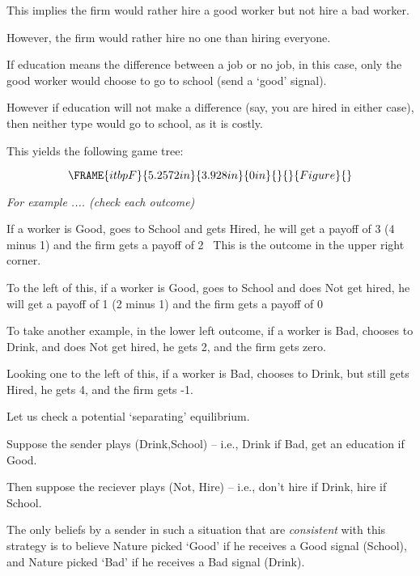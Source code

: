 \documentclass{article}
\begin{document}
This implies the firm would rather hire a good worker but not hire a bad
worker.

However, the firm would rather hire no one than hiring everyone.

If education means the difference between a job or no job, in this case,
only the good worker would choose to go to school (send a `good' signal).

However if education will not make a difference (say, you are hired in
either case), then neither type would go to school, as it is costly.

This yields the following game tree:

\[
\FRAME{itbpF}{5.2572in}{3.928in}{0in}{}{}{Figure}{\special{language
"Scientific Word";type "GRAPHIC";maintain-aspect-ratio TRUE;display
"USEDEF";valid_file "T";width 5.2572in;height 3.928in;depth
0in;original-width 9.6565in;original-height 7.2082in;cropleft "0";croptop
"1";cropright "1";cropbottom "0";tempfilename
'JSY5860O.wmf';tempfile-properties "XPR";}}
\]

\textit{For example .... (check each outcome)}

If a worker is Good, goes to School and gets Hired, he will get a payoff of
3 (4 minus 1) and the firm gets a payoff of 2 \ This is the outcome in the
upper right corner.

\bigskip

To the left of this, if a worker is Good, goes to School and does Not get
hired, he will get a payoff of 1 (2 minus 1) and the firm gets a payoff of 0
\ 

\bigskip

To take another example, in the lower left outcome, if a worker is Bad,
chooses to Drink, and does Not get hired, he gets 2, and the firm gets zero.
\ 

Looking one to the left of this, if a worker is Bad, chooses to Drink, but
still gets Hired, he gets 4, and the firm gets -1. \ 

\bigskip

Let us check a potential `separating' equilibrium.

Suppose the sender plays (Drink,School) -- i.e., Drink if Bad, get an
education if Good.

Then suppose the reciever plays (Not, Hire) -- i.e., don't hire if Drink,
hire if School.

\bigskip

The only beliefs by a sender in such a situation that are \textit{consistent}
with this strategy is to believe Nature picked `Good' if he receives a Good
signal (School), and Nature picked `Bad' if he receives a Bad signal
(Drink). \ 
\end{document}
